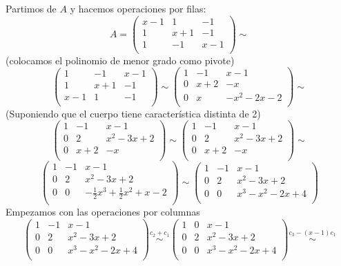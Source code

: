Partimos de \(A\) y hacemos operaciones por filas:
\[
  A=
  \begin{pmatrix}
    x{-}1  & 1  & -1  \\
    1  & x{+}1  & -1  \\
    1  & -1 &  x{-}1  \\
  \end{pmatrix}\sim
\]
(colocamos el polinomio de menor grado como pivote)
\[
  \begin{pmatrix}
    1  & -1 &  x{-}1  \\
    1  & x{+}1  & -1  \\
    x{-}1  & 1  & -1  \\
  \end{pmatrix}\sim
  \begin{pmatrix}
    1   & -1   &  x-1  \\
    0   & x+2  & -x  \\
    0   & x    & -x^2-2x-2  \\
  \end{pmatrix}\sim
\]
(Suponiendo que el cuerpo tiene característica
  distinta de 2)
\[
  \begin{pmatrix}
    1   & -1   &  x-1  \\
    0   & 2    & x^2-3x+2  \\
    0   & x+2  & -x  \\
  \end{pmatrix}\sim
  \begin{pmatrix}
    1   & -1   &  x-1  \\
    0   & 2    & x^2-3x+2  \\
    0   & x+2  & -x  \\
  \end{pmatrix}\sim
\]
\[
  \begin{pmatrix}
    1   & -1   &  x-1  \\
    0   & 2    & x^2-3x+2  \\
    0   & 0    & -\frac{1}{2}x^3+\frac{1}{2}x^2+x-2  \\
  \end{pmatrix}\sim
  \begin{pmatrix}
    1   & -1   &  x-1  \\
    0   & 2    & x^2-3x+2  \\
    0   & 0    & x^3-x^2-2x+4  \\
  \end{pmatrix}
\]
Empezamos con las operaciones por columnas
\[
  \begin{pmatrix}
    1   & -1   &  x-1  \\
    0   & 2    & x^2-3x+2  \\
    0   & 0    & x^3-x^2-2x+4  \\
  \end{pmatrix}
  \overset{c_2+c_1}{\sim}
  \begin{pmatrix}
    1   & 0   &  x-1  \\
    0   & 2    & x^2-3x+2  \\
    0   & 0    & x^3-x^2-2x+4  \\
  \end{pmatrix}
  \overset{c_3-(x-1)c_1}{\sim}
\]
